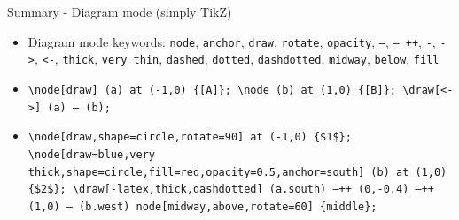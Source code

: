 \documentclass[aspectratio=169]{beamer}
\begin{document}
\begin{frame}{Summary - Diagram mode (simply TikZ)}
    \begin{itemize}
        \item<+-> Diagram mode keywords: \texttt{node}, \texttt{anchor}, \texttt{draw}, \texttt{rotate}, \texttt{opacity}, \texttt{--},  \texttt{-- ++}, \texttt{-}, \texttt{->}, \texttt{<-}, \texttt{thick}, \texttt{very thin}, \texttt{dashed}, \texttt{dotted}, \texttt{dashdotted}, \texttt{midway}, \texttt{below}, \texttt{fill}
        \item<+-> \texttt{\textbackslash node[draw] (a) at (-1,0) \{[A]\}; \textbackslash node (b) at (1,0) \{[B]\}; \textbackslash draw[<->] (a) -- (b);}
        \begin{center}
        \end{center}
        \item<+-> \texttt{\textbackslash node[draw,shape=circle,rotate=90] at (-1,0) \{\$1\$\}; \textbackslash node[draw=blue,very thick,shape=circle,fill=red,opacity=0.5,anchor=south] (b) at (1,0) \{\$2\$\}; \textbackslash draw[-latex,thick,dashdotted] (a.south) --++ (0,-0.4) --++ (1,0) -- (b.west) node[midway,above,rotate=60] \{middle\};}
        \begin{center}
        \end{center}
    \end{itemize}
\end{frame}
\end{document}
